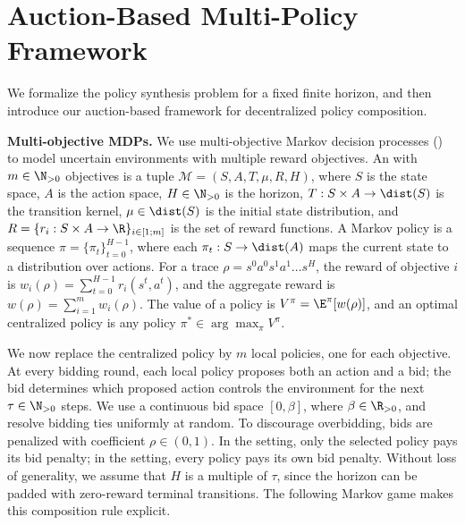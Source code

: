 \section{Auction-Based Multi-Policy Framework}

We formalize the policy synthesis problem for a fixed finite horizon, and then introduce our auction-based framework for decentralized policy composition.

\textbf{Multi-objective MDPs.}
We use multi-objective Markov decision processes (\momdps) to model uncertain environments with multiple reward objectives.
An \momdp with \(m\in \N_{>0}\) objectives is a tuple \(\mathcal{M}=(S,A,T,\mu,R,H)\), where \(S\) is the state space, \(A\) is the action space, \(H\in \N_{>0}\) is the horizon, \(T:S\times A\to \dist(S)\) is the transition kernel, \(\mu\in \dist(S)\) is the initial state distribution, and \(R=\{r_i:S\times A\to \R\}_{i\in [1;m]}\) is the set of reward functions.
A Markov policy is a sequence \(\pi=\{\pi_t\}_{t=0}^{H-1}\), where each \(\pi_t:S\to \dist(A)\) maps the current state to a distribution over actions.
For a trace \(\rho=s^0a^0s^1a^1\ldots s^H\), the reward of objective \(i\) is \(w_i(\rho)=\sum_{t=0}^{H-1} r_i(s^t,a^t)\), and the aggregate reward is \(w(\rho)=\sum_{i=1}^m w_i(\rho)\).
The value of a policy is \(V^\pi=\E^\pi[w(\rho)]\), and an optimal centralized policy is any policy \(\pi^*\in \arg\max_\pi V^\pi\).

We now replace the centralized policy by \(m\) local policies, one for each objective.
At every bidding round, each local policy proposes both an action and a bid; the bid determines which proposed action controls the environment for the next \(\tau\in\N_{>0}\) steps.
We use a continuous bid space \([0,\beta]\), where \(\beta\in\R_{>0}\), and resolve bidding ties uniformly at random.
To discourage overbidding, bids are penalized with coefficient \(\rho\in(0,1)\).
In the \poorman setting, only the selected policy pays its bid penalty; in the \allpay setting, every policy pays its own bid penalty.
Without loss of generality, we assume that \(H\) is a multiple of \(\tau\), since the horizon can be padded with zero-reward terminal transitions.
The following Markov game makes this composition rule explicit.


